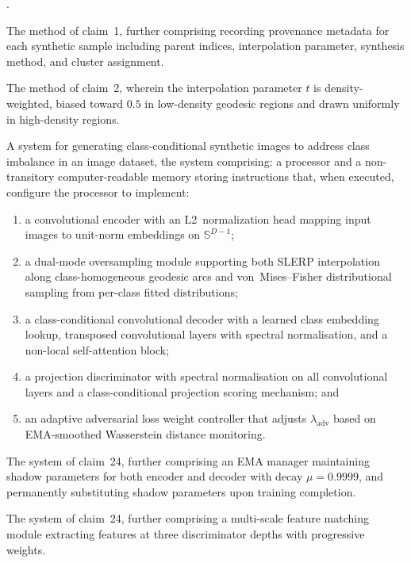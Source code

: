 \documentclass[12pt,letterpaper]{article}
\newcommand{\Sphere}{\mathbb{S}}
\newcounter{claimnum}
\newenvironment{claims}{%
  \setcounter{claimnum}{0}
  \begin{list}{\arabic{claimnum}.}{%
    \usecounter{claimnum}
    \setlength{\leftmargin}{2em}
    \setlength{\labelsep}{0.5em}
    \setlength{\itemsep}{0pt}
    \setlength{\parsep}{6pt plus 2pt}
  }%
}{\end{list}}
\begin{document}
\begin{claims}
\item The method of claim~1, further comprising recording provenance
metadata for each synthetic sample including parent indices, interpolation
parameter, synthesis method, and cluster assignment.

\item The method of claim~2, wherein the interpolation parameter $t$ is
density-weighted, biased toward $0.5$ in low-density geodesic regions and
drawn uniformly in high-density regions.


\item A system for generating class-conditional synthetic images to address
class imbalance in an image dataset, the system comprising:
a processor and a non-transitory computer-readable memory storing
instructions that, when executed, configure the processor to implement:
\begin{enumerate}[label=(\alph*),leftmargin=1.5em,nosep]
  \item a convolutional encoder with an L2~normalization head mapping input
    images to unit-norm embeddings on $\Sphere^{D-1}$;
  \item a dual-mode oversampling module supporting both SLERP interpolation
    along class-homogeneous geodesic arcs and von~Mises--Fisher distributional
    sampling from per-class fitted distributions;
  \item a class-conditional convolutional decoder with a learned class
    embedding lookup, transposed convolutional layers with spectral
    normalisation, and a non-local self-attention block;
  \item a projection discriminator with spectral normalisation on all
    convolutional layers and a class-conditional projection scoring
    mechanism; and
  \item an adaptive adversarial loss weight controller that adjusts
    $\lambda_{\text{adv}}$ based on EMA-smoothed Wasserstein distance
    monitoring.
\end{enumerate}

\item The system of claim~24, further comprising an EMA manager maintaining
shadow parameters for both encoder and decoder with decay $\mu = 0.9999$,
and permanently substituting shadow parameters upon training completion.

\item The system of claim~24, further comprising a multi-scale feature
matching module extracting features at three discriminator depths with
progressive weights.


\end{claims}
\end{document}
